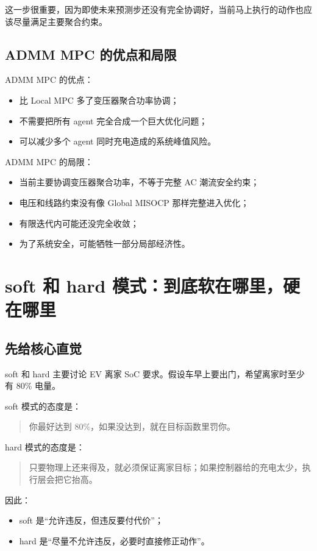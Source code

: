 \documentclass[UTF8,zihao=-4]{ctexart}
\begin{document}
这一步很重要，因为即使未来预测步还没有完全协调好，当前马上执行的动作也应该尽量满足主要聚合约束。

\subsection{ADMM MPC 的优点和局限}

ADMM MPC 的优点：
\begin{itemize}
  \item 比 Local MPC 多了变压器聚合功率协调；
  \item 不需要把所有 agent 完全合成一个巨大优化问题；
  \item 可以减少多个 agent 同时充电造成的系统峰值风险。
\end{itemize}

ADMM MPC 的局限：
\begin{itemize}
  \item 当前主要协调变压器聚合功率，不等于完整 AC 潮流安全约束；
  \item 电压和线路约束没有像 Global MISOCP 那样完整进入优化；
  \item 有限迭代内可能还没完全收敛；
  \item 为了系统安全，可能牺牲一部分局部经济性。
\end{itemize}

\section{soft 和 hard 模式：到底软在哪里，硬在哪里}

\subsection{先给核心直觉}

soft 和 hard 主要讨论 EV 离家 SoC 要求。假设车早上要出门，希望离家时至少有 80\% 电量。

soft 模式的态度是：
\begin{quote}
你最好达到 80\%，如果没达到，就在目标函数里罚你。
\end{quote}

hard 模式的态度是：
\begin{quote}
只要物理上还来得及，就必须保证离家目标；如果控制器给的充电太少，执行层会把它抬高。
\end{quote}

因此：
\begin{itemize}
  \item soft 是“允许违反，但违反要付代价”；
  \item hard 是“尽量不允许违反，必要时直接修正动作”。
\end{itemize}
\end{document}
